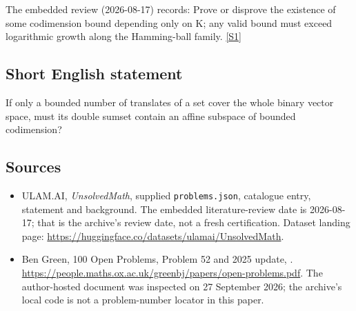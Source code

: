 \documentclass[11pt,a4paper]{article}
\newcommand{\sref}[2]{\hyperlink{source:#1:#2}{[S#2]}}
\begin{document}
The embedded review (2026-08-17) records: Prove or disprove the existence of some codimension bound depending only on K; any valid bound must exceed logarithmic growth along the Hamming-ball family. \sref{statement}{1}

\subsection{Short English statement}

If only a bounded number of translates of a set cover the whole binary vector space, must its double sumset contain an affine subspace of bounded codimension?

\subsection{Sources}

{\small

\begin{itemize}

\item[\hypertarget{source:statement:1}{S1}] ULAM.AI, \emph{UnsolvedMath}, supplied \texttt{problems.json}, catalogue entry, statement and background. The embedded literature-review date is 2026-08-17; that is the archive’s review date, not a fresh certification. Dataset landing page: \url{https://huggingface.co/datasets/ulamai/UnsolvedMath}.

\item[\hypertarget{source:statement:2}{S2}] Ben Green, 100 Open Problems, Problem 52 and 2025 update, . \url{https://people.maths.ox.ac.uk/greenbj/papers/open-problems.pdf}. The author-hosted document was inspected on 27 September 2026; the archive’s local code is not a problem-number locator in this paper.

\end{itemize}

}

\label{end:statement}
\end{document}
